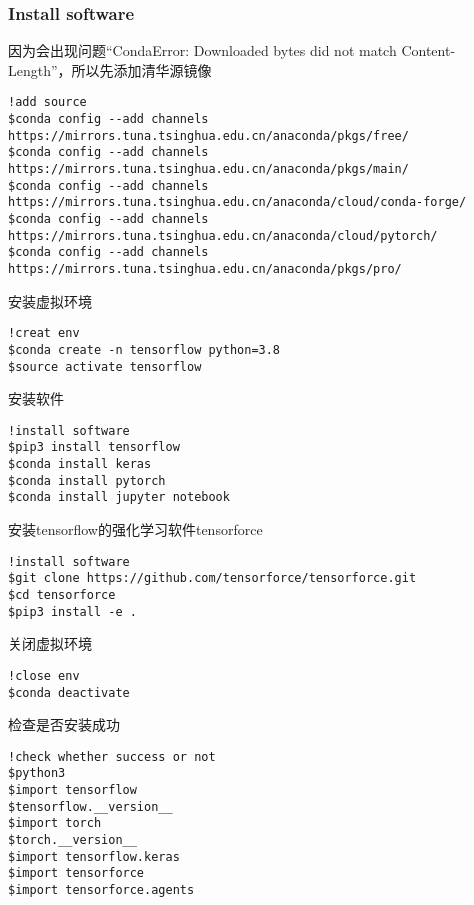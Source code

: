 \documentclass{hmj}
\begin{document}
\subsubsection{Install software}
因为会出现问题“CondaError: Downloaded bytes did not match Content-Length”，所以先添加清华源镜像
\begin{lstlisting}
!add source
$conda config --add channels https://mirrors.tuna.tsinghua.edu.cn/anaconda/pkgs/free/
$conda config --add channels https://mirrors.tuna.tsinghua.edu.cn/anaconda/pkgs/main/
$conda config --add channels https://mirrors.tuna.tsinghua.edu.cn/anaconda/cloud/conda-forge/
$conda config --add channels https://mirrors.tuna.tsinghua.edu.cn/anaconda/cloud/pytorch/
$conda config --add channels https://mirrors.tuna.tsinghua.edu.cn/anaconda/pkgs/pro/
\end{lstlisting}
安装虚拟环境
\begin{lstlisting}
!creat env
$conda create -n tensorflow python=3.8
$source activate tensorflow
\end{lstlisting}
安装软件
\begin{lstlisting}
!install software
$pip3 install tensorflow
$conda install keras
$conda install pytorch
$conda install jupyter notebook
\end{lstlisting}
安装tensorflow的强化学习软件tensorforce
\begin{lstlisting}
!install software
$git clone https://github.com/tensorforce/tensorforce.git
$cd tensorforce
$pip3 install -e .
\end{lstlisting}
关闭虚拟环境
\begin{lstlisting}
!close env
$conda deactivate
\end{lstlisting}
检查是否安装成功
\begin{lstlisting}
!check whether success or not
$python3
$import tensorflow
$tensorflow.__version__
$import torch
$torch.__version__
$import tensorflow.keras
$import tensorforce
$import tensorforce.agents
\end{lstlisting}















\end{document}
